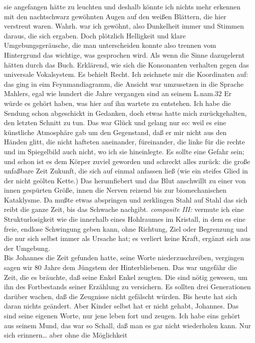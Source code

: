 \documentclass[
]{article}
\begin{document}
sie angefangen hätte zu leuchten und deshalb könnte ich nichts mehr
erkennen mit den nachtschwarz gewöhnten Augen auf den weißen Blättern,
die hier verstreut waren. Wahrh. war ich gewöhnt, also Dunkelheit immer
und Stimmen daraus, die sich ergaben. Doch plötzlich Helligkeit und
klare Umgebungsgeräusche, die man unterscheiden konnte also trennen vom
Hintergrund das wichtige, was gesprochen wird. Als wenn die Sinne
dazugelernt hätten durch das Buch. Erklärend, wie sich die Konsonanten
verhalten gegen das universale Vokalsystem. Es behielt Recht. Ich
zeichnete mir die Koordinaten auf: das ging in eim Feynmandiagramm, die
Ansicht war umzusetzen in die Sprache Mahlers, egal wie hundert die
Jahre vergangen sind an seinem L.nam.32 Er würde es gehört haben, was
hier auf ihn wartete zu entstehen. Ich habe die Sendung schon
abgeschickt in Gedanken, doch etwas hatte mich zurückgehalten, den
letzten Schnitt zu tun. Das war Glück und gelang nur so: weil es eine
künstliche Atmosphäre gab um den Gegenstand, daß er mir nicht aus den
Händen glitt, die nicht hafteten aneinander, füreinander, die linke für
die rechte und im Spiegelbild auch nicht, wo ich sie hineinlegte. Es
sollte eine Gefahr sein; und schon ist es dem Körper zuviel geworden und
schreckt alles zurück: die große unfaßbare Zeit Zukunft, die sich auf
einmal anfassen ließ (wie ein steifes Glied in der nicht geölten Kette.)
Das herumfiebert und das Blut anschwillt zu einer von innen gespürten
Größe, innen die Nerven reizend bis zur biomechanischen Kataklysme. Da
mußte etwas abspringen und zerklingen Stahl auf Stahl das sich reibt die
ganze Zeit, bis das Schwache nachgibt. \emph{composite III: }vermute ich
eine Strukturlosigkeit wie die innerhalb eines Hohlraumes im Kristall,
in dem es eine freie, endlose Schwingung geben kann, ohne Richtung, Ziel
oder Begrenzung und die nur sich selbst immer als Ursache hat; es
verliert keine Kraft, ergänzt sich aus der Umgebung.\\
Bis Johannes die Zeit gefunden hatte, seine Worte niederzuschreiben,
vergingen sagen wir 80 Jahre dem Jüngstem der Hinterbliebenen. Das war
ungefähr die Zeit, die es bräuchte, daß seine Enkel Enkel zeugten. Die
sind nötig gewesen, um ihn des Fortbestands seiner Erzählung zu
versichern. Es sollten drei Generationen darüber wachen, daß die
Zeugnisse nicht gefälscht würden. Bis heute hat sich daran nichts
geändert. Aber Kinder selbst hat er nicht gehabt, Johannes. Das sind
seine eigenen Worte, nur jene leben fort und zeugen. Ich habe eins
gehört aus seinem Mund, das war so Schall, daß man es gar nicht
wiederholen kann. Nur sich erinnern\ldots{} aber ohne die Möglichkeit
\end{document}
